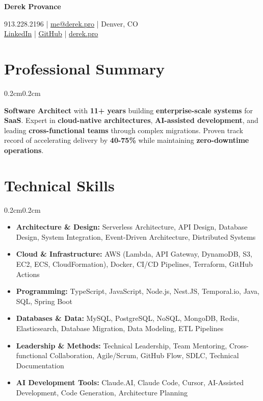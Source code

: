 \documentclass[10pt, letterpaper]{article}
\newenvironment{onecolentry}{
    \begin{adjustwidth}{0.2cm}{0.2cm}
}{
    \end{adjustwidth}
}
\newenvironment{header}{
    \setlength{\topsep}{0pt}\par\kern\topsep\centering\linespread{1.5}
}{
    \par\kern\topsep
}
\let\hrefWithoutArrow\href
\begin{document}
\begin{header}
    {\fontsize{24pt}{28pt}\selectfont\textbf{Derek Provance}}
    \vspace{0.2cm}

    \normalsize
    913.228.2196 | \hrefWithoutArrow{mailto:me@derek.pro}{me@derek.pro} | Denver, CO \\
    \hrefWithoutArrow{https://linkedin.com/in/derekprovance}{LinkedIn} | \hrefWithoutArrow{https://github.com/derekprovance}{GitHub} | \hrefWithoutArrow{https://derek.pro}{derek.pro}
\end{header}

\vspace{0.2cm}

\section{Professional Summary}
\begin{onecolentry}
    \textbf{Software Architect} with \textbf{11+ years} building \textbf{enterprise-scale systems} for \textbf{SaaS}. Expert in \textbf{cloud-native architectures}, \textbf{AI-assisted development}, and leading \textbf{cross-functional teams} through complex migrations. Proven track record of accelerating delivery by \textbf{40-75\%} while maintaining \textbf{zero-downtime operations}.
\end{onecolentry}

\section{Technical Skills}
\begin{onecolentry}
\begin{itemize}[leftmargin=0.5cm]
    \item \textbf{Architecture \& Design:} Serverless Architecture, API Design, Database Design, System Integration, Event-Driven Architecture, Distributed Systems
    \item \textbf{Cloud \& Infrastructure:} AWS (Lambda, API Gateway, DynamoDB, S3, EC2, ECS, CloudFormation), Docker, CI/CD Pipelines, Terraform, GitHub Actions
    \item \textbf{Programming:} TypeScript, JavaScript, Node.js, Nest.JS, Temporal.io, Java, SQL, Spring Boot
    \item \textbf{Databases \& Data:} MySQL, PostgreSQL, NoSQL, MongoDB, Redis, Elasticsearch, Database Migration, Data Modeling, ETL Pipelines
    \item \textbf{Leadership \& Methods:} Technical Leadership, Team Mentoring, Cross-functional Collaboration, Agile/Scrum, GitHub Flow, SDLC, Technical Documentation
    \item \textbf{AI Development Tools:} Claude.AI, Claude Code, Cursor, AI-Assisted Development, Code Generation, Architecture Planning
\end{itemize}
\end{onecolentry}
\end{document}
